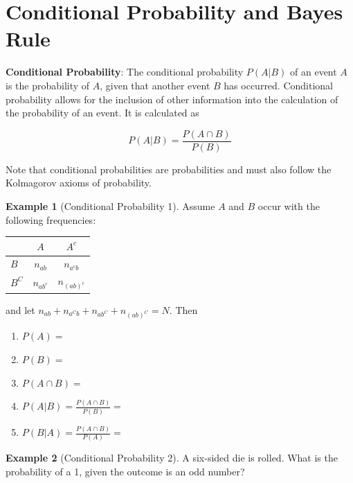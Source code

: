 \documentclass[
]{book}
\providecommand{\tightlist}{%
  \setlength{\itemsep}{0pt}\setlength{\parskip}{0pt}}
\theoremstyle{definition}
\theoremstyle{definition}
\newtheorem{example}{Example}[chapter]
\theoremstyle{definition}
\theoremstyle{remark}
\begin{document}
\hypertarget{conditional-probability-and-bayes-rule}{%
\section{Conditional Probability and Bayes Rule}\label{conditional-probability-and-bayes-rule}}

\textbf{Conditional Probability}: The conditional probability \(P(A|B)\) of an event \(A\) is the probability of \(A\), given that another event \(B\) has occurred. Conditional probability allows for the inclusion of other information into the calculation of the probability of an event. It is calculated as

\[P(A|B)=\frac{P(A\cap B)}{P(B)}\]

Note that conditional probabilities are probabilities and must also follow the Kolmagorov axioms of probability.

\begin{example}[Conditional Probability 1]
\protect\hypertarget{exm:condprobexm1}{}{\label{exm:condprobexm1} {} }
Assume \(A\) and \(B\) occur with the following frequencies: \(\quad\)

\begin{longtable}[]{@{}lcc@{}}
\toprule
& \(A\) & \(A^c\)\tabularnewline
\midrule
\endhead
\(B\) & \(n_{ab}\) & \(n_{a^cb}\)\tabularnewline
\(B^C\) & \(n_{ab^c}\) & \(n_{(ab)^c}\)\tabularnewline
\bottomrule
\end{longtable}

and let \(n_{ab}+n_{a^Cb}+n_{ab^C}+n_{(ab)^C}=N\). Then

\begin{enumerate}
\def\labelenumi{\arabic{enumi}.}
\tightlist
\item
  \(P(A)=\)
\item
  \(P(B)=\)
\item
  \(P(A\cap B)=\)
\item
  \(P(A|B)= \frac{P(A\cap B)}{P(B)}=\)
\item
  \(P(B|A)= \frac{P(A\cap B)}{P(A)}=\)
\end{enumerate}
\end{example}

\begin{example}[Conditional Probability 2]
\protect\hypertarget{exm:condprobexm2}{}{\label{exm:condprobexm2} {} }
A six-sided die is rolled. What is the probability of a 1, given the outcome is an odd number?
\end{example}
\end{document}
